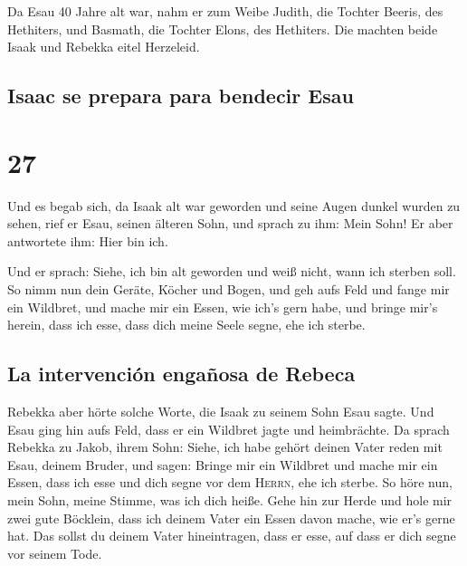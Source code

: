  Da Esau 40 Jahre alt war, nahm er zum Weibe Judith, die
Tochter Beeris, des Hethiters, und Basmath, die Tochter Elons, des
Hethiters.  Die machten beide Isaak und Rebekka eitel
Herzeleid.

\hypertarget{isaac-se-prepara-para-bendecir-esau}{%
\subsection{Isaac se prepara para bendecir
Esau}\label{isaac-se-prepara-para-bendecir-esau}}

\hypertarget{section-26}{%
\section{27}\label{section-26}}

 Und es begab sich, da Isaak alt war geworden und seine
Augen dunkel wurden zu sehen, rief er Esau, seinen älteren Sohn, und
sprach zu ihm: Mein Sohn! Er aber antwortete ihm: Hier bin ich.

 Und er sprach: Siehe, ich bin alt geworden und weiß
nicht, wann ich sterben soll.  So nimm nun dein Geräte,
Köcher und Bogen, und geh aufs Feld und fange mir ein Wildbret,
 und mache mir ein Essen, wie ich's gern habe, und bringe
mir's herein, dass ich esse, dass dich meine Seele segne, ehe ich
sterbe.

\hypertarget{la-intervenciuxf3n-engauxf1osa-de-rebeca}{%
\subsection{La intervención engañosa de
Rebeca}\label{la-intervenciuxf3n-engauxf1osa-de-rebeca}}

 Rebekka aber hörte solche Worte, die Isaak zu seinem Sohn
Esau sagte. Und Esau ging hin aufs Feld, dass er ein Wildbret jagte und
heimbrächte.  Da sprach Rebekka zu Jakob, ihrem Sohn:
Siehe, ich habe gehört deinen Vater reden mit Esau, deinem Bruder, und
sagen:  Bringe mir ein Wildbret und mache mir ein Essen,
dass ich esse und dich segne vor dem \textsc{Herrn}, ehe ich sterbe.
 So höre nun, mein Sohn, meine Stimme, was ich dich heiße.
 Gehe hin zur Herde und hole mir zwei gute Böcklein, dass
ich deinem Vater ein Essen davon mache, wie er's gerne hat.
 Das sollst du deinem Vater hineintragen, dass er esse,
auf dass er dich segne vor seinem Tode.

